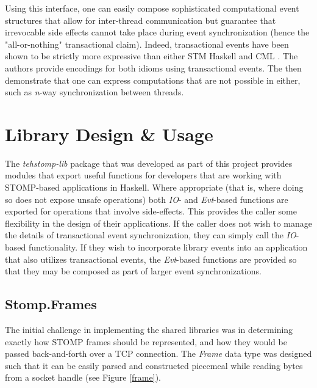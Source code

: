 \documentclass[conference, letterpaper]{IEEEtran}
\begin{document}
Using this interface, one can easily compose sophisticated computational event structures that allow for inter-thread communication but guarantee that irrevocable side effects cannot take place during event synchronization (hence the "all-or-nothing" transactional claim). Indeed, transactional events have been shown to be strictly more expressive than either STM Haskell and CML \cite{te:original}. The authors provide encodings for both idioms using transactional events. The then demonstrate that one can express computations that are not possible in either, such as \textit{n}-way synchronization between threads.

\section{Library Design \& Usage}

The \textit{tehstomp-lib} package that was developed as part of this project provides modules that export useful functions for developers that are working with STOMP-based applications in Haskell. Where appropriate (that is, where doing so does not expose unsafe operations) both \textit{IO}- and \textit{Evt}-based functions are exported for operations that involve side-effects. This provides the caller some flexibility in the design of their applications. If the caller does not wish to manage the details of transactional event synchronization, they can simply call the \textit{IO}-based functionality. If they wish to incorporate library events into an application that also utilizes transactional events, the \textit{Evt}-based functions are provided so that they may be composed as part of larger event synchronizations.

\subsection{Stomp.Frames}

The initial challenge in implementing the shared libraries was in determining exactly how STOMP frames should be represented, and how they would be passed back-and-forth over a TCP connection. The \textit{Frame} data type was designed such that it can be easily parsed and constructed piecemeal while reading bytes from a socket handle (see Figure \ref{frame}).
\end{document}
